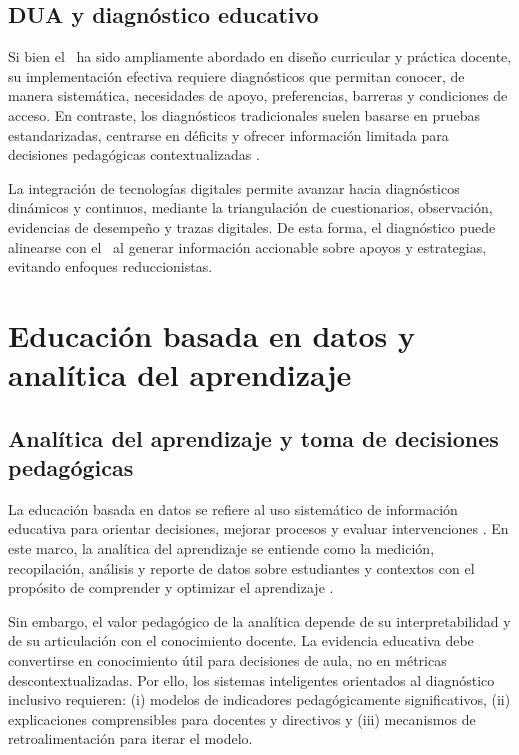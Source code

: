 \begin{refsection}
\subsection{DUA y diagnóstico educativo}

Si bien el \DUA\ ha sido ampliamente abordado en diseño curricular y práctica docente, su implementación efectiva requiere diagnósticos que permitan conocer, de manera sistemática, necesidades de apoyo, preferencias, barreras y condiciones de acceso. En contraste, los diagnósticos tradicionales suelen basarse en pruebas estandarizadas, centrarse en déficits y ofrecer información limitada para decisiones pedagógicas contextualizadas \parencite{meyer2014}.

La integración de tecnologías digitales permite avanzar hacia diagnósticos dinámicos y continuos, mediante la triangulación de cuestionarios, observación, evidencias de desempeño y trazas digitales. De esta forma, el diagnóstico puede alinearse con el \DUA\ al generar información accionable sobre apoyos y estrategias, evitando enfoques reduccionistas.

\section{Educación basada en datos y analítica del aprendizaje}

\subsection{Analítica del aprendizaje y toma de decisiones pedagógicas}

La educación basada en datos se refiere al uso sistemático de información educativa para orientar decisiones, mejorar procesos y evaluar intervenciones \parencite{mandinach2016}. En este marco, la analítica del aprendizaje se entiende como la medición, recopilación, análisis y reporte de datos sobre estudiantes y contextos con el propósito de comprender y optimizar el aprendizaje \parencite{siemens2012}.

Sin embargo, el valor pedagógico de la analítica depende de su interpretabilidad y de su articulación con el conocimiento docente. La evidencia educativa debe convertirse en conocimiento útil para decisiones de aula, no en métricas descontextualizadas. Por ello, los sistemas inteligentes orientados al diagnóstico inclusivo requieren: (i) modelos de indicadores pedagógicamente significativos, (ii) explicaciones comprensibles para docentes y directivos y (iii) mecanismos de retroalimentación para iterar el modelo.


\end{refsection}

